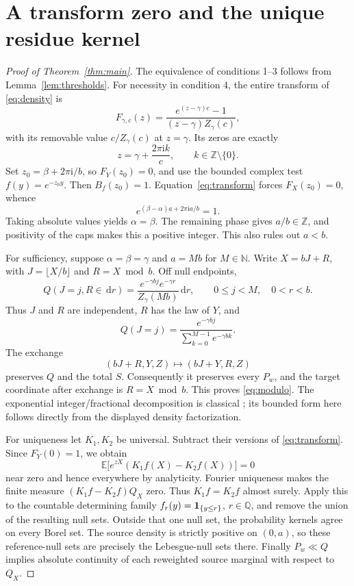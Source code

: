 \documentclass[11pt,a4paper]{article}
\theoremstyle{remark}\newtheorem*{ednote}{Editorial note (ProveIt, 2026-10-01)}
\newcommand{\E}{\mathbb E}\newcommand{\R}{\mathbb R}\newcommand{\C}{\mathbb C}\newcommand{\N}{\mathbb N}
\newcommand{\dd}{\,\mathrm d}\newcommand{\ii}{\mathrm i}
\begin{document}
\section{A transform zero and the unique residue kernel}
\begin{proof}[Proof of Theorem~\ref{thm:main}]
The equivalence of conditions 1--3 follows from Lemma~\ref{lem:thresholds}. For necessity in condition 4, the entire transform of \eqref{eq:density} is
\begin{equation}\label{eq:exptransform}
 F_{\gamma,c}(z)=
 \frac{e^{(z-\gamma)c}-1}{(z-\gamma)Z_\gamma(c)},
\end{equation}
with its removable value $c/Z_\gamma(c)$ at $z=\gamma$. Its zeros are exactly
\[
 z=\gamma+\frac{2\pi\ii k}{c},\qquad k\in\mathbb Z\setminus\{0\}.
\]
Set $z_0=\beta+2\pi\ii/b$, so $F_Y(z_0)=0$, and use the bounded complex test $f(y)=e^{-z_0y}$. Then $B_f(z_0)=1$. Equation~\eqref{eq:transform} forces $F_X(z_0)=0$, whence
\begin{equation}\label{eq:necessary}
 e^{(\beta-\alpha)a+2\pi\ii a/b}=1.
\end{equation}
Taking absolute values yields $\alpha=\beta$. The remaining phase gives $a/b\in\mathbb Z$, and positivity of the caps makes this a positive integer. This also rules out $a<b$.

For sufficiency, suppose $\alpha=\beta=\gamma$ and $a=Mb$ for $M\in\N$. Write $X=bJ+R$, with $J=\lfloor X/b\rfloor$ and $R=X\bmod b$. Off null endpoints,
\[
 Q(J=j,R\in\dd r)=\frac{e^{-\gamma bj}e^{-\gamma r}}{Z_\gamma(Mb)}\dd r,
 \qquad 0\le j<M,\quad 0<r<b.
\]
Thus $J$ and $R$ are independent, $R$ has the law of $Y$, and
\[
 Q(J=j)=\frac{e^{-\gamma bj}}{\sum_{k=0}^{M-1}e^{-\gamma bk}}.
\]
The exchange
\begin{equation}\label{eq:swap}
 (bJ+R,Y,Z)\longmapsto(bJ+Y,R,Z)
\end{equation}
preserves $Q$ and the total $S$. Consequently it preserves every $P_w$, and the target coordinate after exchange is $R=X\bmod b$. This proves \eqref{eq:modulo}. The exponential integer/fractional decomposition is classical \cite{Steutel}; its bounded form here follows directly from the displayed density factorization.

For uniqueness let $K_1,K_2$ be universal. Subtract their versions of \eqref{eq:transform}. Since $F_Y(0)=1$, we obtain
\[
 \E\bigl[e^{zX}(K_1f(X)-K_2f(X))\bigr]=0
\]
near zero and hence everywhere by analyticity. Fourier uniqueness makes the finite measure $(K_1f-K_2f)Q_X$ zero. Thus $K_1f=K_2f$ almost surely. Apply this to the countable determining family $f_r(y)=\mathbf1_{\{y\le r\}}$, $r\in\mathbb Q$, and remove the union of the resulting null sets. Outside that one null set, the probability kernels agree on every Borel set. The source density is strictly positive on $(0,a)$, so these reference-null sets are precisely the Lebesgue-null sets there. Finally $P_w\ll Q$ implies absolute continuity of each reweighted source marginal with respect to $Q_X$.
\end{proof}
\end{document}
